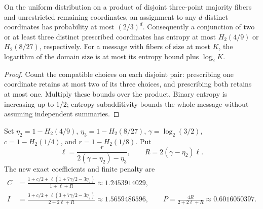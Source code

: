 \begin{lemma}
  \label{lem:lowerbounds-algebraic-geometry-conditional-entropy}
  \leanok
  On the uniform distribution on a product of disjoint three-point majority
  fibers and unrestricted remaining coordinates, an assignment to any $d$
  distinct coordinates has probability at most $(2/3)^d$. Consequently a
  conjunction of two or at least three distinct prescribed coordinates has
  entropy at most $H_2(4/9)$ or $H_2(8/27)$, respectively. For a message with
  fibers of size at most $K$, the logarithm of the domain size is at most its
  entropy bound plus $\log_2 K$.
\end{lemma}
\begin{proof}
  \leanok
  Count the compatible choices on each disjoint pair: prescribing one
  coordinate retains at most two of its three choices, and prescribing both
  retains at most one. Multiply these bounds over the product. Binary entropy
  is increasing up to $1/2$; entropy subadditivity bounds the whole message
  without assuming independent summaries.
\end{proof}

\begin{definition}
  \label{def:lowerbounds-algebraic-geometry-conditional-coefficients}
  \leanok
  Set $\eta_2=1-H_2(4/9)$, $\eta_3=1-H_2(8/27)$,
  $\gamma=\log_2(3/2)$, $c=1-H_2(1/4)$, and $r=1-H_2(1/8)$. Put
  \[
    \ell=\frac{r}{2(\gamma-\eta_2)-\eta_3},\qquad
    R=2(\gamma-\eta_2)\ell.
  \]
  The new exact coefficients and finite penalty are
  \[
  \begin{aligned}
    C&=\frac{1+c/2+\ell(1+7\gamma/2-3\eta_2)}{1+\ell+R}
       \approx1.2453914029,\\
    I&=\frac{3+c/2+\ell(3+7\gamma/2-3\eta_2)}{2+2\ell+R}
       \approx1.5659486596,\qquad
    P=\frac{4R}{2+2\ell+R}\approx0.6016050397.
  \end{aligned}
  \]
\end{definition}

